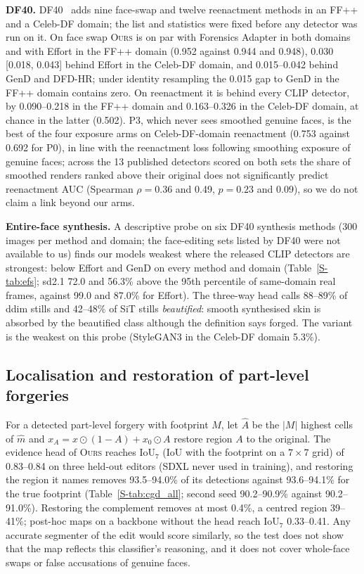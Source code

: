 \documentclass[conference]{IEEEtran}
\newcommand{\ours}{\textsc{Ours}}
\begin{document}
\textbf{DF40.} DF40~\cite{df40} adds nine face-swap and twelve reenactment methods in an FF++ and a Celeb-DF domain; the list
and statistics were fixed before any detector was run on it. On face swap \ours{} is on par with Forensics Adapter in both domains
and with Effort in the FF++ domain (0.952 against 0.944 and 0.948), 0.030 [0.018, 0.043] behind Effort in the Celeb-DF domain, and
0.015--0.042 behind GenD and DFD-HR; under identity resampling the 0.015 gap to GenD in the FF++ domain contains zero. On
reenactment it is behind every CLIP detector, by 0.090--0.218 in the FF++ domain and 0.163--0.326 in the Celeb-DF domain, at
chance in the latter (0.502). P3, which never sees smoothed genuine faces, is the best of the four exposure arms on Celeb-DF-domain reenactment (0.753
against 0.692 for P0), in line with the reenactment loss following smoothing exposure of genuine faces; across the 13 published
detectors scored on both sets the share of smoothed renders ranked above their original does not significantly predict reenactment
AUC (Spearman $\rho=0.36$ and 0.49, $p=0.23$ and 0.09), so we do not claim a link beyond our arms.

\textbf{Entire-face synthesis.} A descriptive probe on six DF40 synthesis methods (300 images per method and domain; the face-editing
sets listed by DF40 were not available to us) finds our models weakest where the released CLIP detectors are strongest: below
Effort and GenD on every method and domain (Table~\ref{S-tab:efs}; sd2.1 72.0 and 56.3\% above the 95th percentile of same-domain
real frames, against 99.0 and 87.0\% for Effort). The three-way head calls 88--89\% of ddim stills and 42--48\% of SiT stills
\emph{beautified}: smooth synthesised skin is absorbed by the beautified class although the definition says forged. The variant is
the weakest on this probe (StyleGAN3 in the Celeb-DF domain 5.3\%).

\subsection{Localisation and restoration of part-level forgeries}
\label{sec:cgd}
For a detected part-level forgery with footprint $M$, let $\hat A$ be the $|M|$ highest cells of $\hat m$ and
$x_A=x\odot(1-A)+x_0\odot A$ restore region $A$ to the original. The evidence head of \ours{} reaches
IoU$_7$ (IoU with the footprint on a $7\times7$ grid) of 0.83--0.84 on three held-out editors (SDXL never used in training),
and restoring the region it names removes 93.5--94.0\% of its detections against 93.6--94.1\% for the true footprint
(Table~\ref{S-tab:cgd_all}; second seed 90.2--90.9\% against 90.2--91.0\%). Restoring the complement removes at most 0.4\%, a
centred region 39--41\%; post-hoc maps on a backbone without the head reach IoU$_7$ 0.33--0.41. Any accurate segmenter of the
edit would score similarly, so the test does not show that the map reflects this classifier's reasoning, and it does not cover
whole-face swaps or false accusations of genuine faces.
\end{document}
